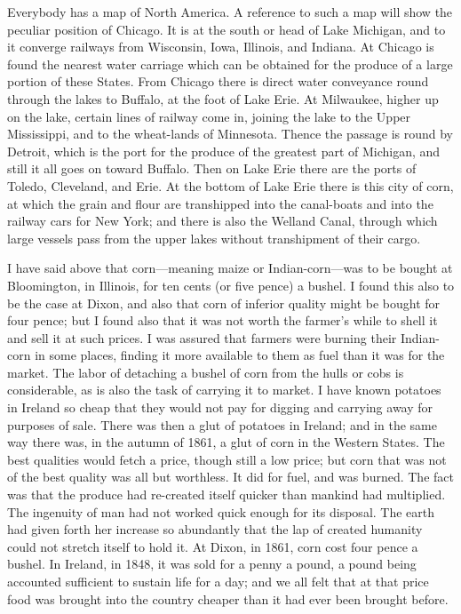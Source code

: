 Everybody has a map of North America.  A reference to such a map
will show the peculiar position of Chicago.  It is at the south or
head of Lake Michigan, and to it converge railways from Wisconsin,
Iowa, Illinois, and Indiana.  At Chicago is found the nearest water
carriage which can be obtained for the produce of a large portion
of these States.  From Chicago there is direct water conveyance
round through the lakes to Buffalo, at the foot of Lake Erie.  At
Milwaukee, higher up on the lake, certain lines of railway come in,
joining the lake to the Upper Mississippi, and to the wheat-lands
of Minnesota.  Thence the passage is round by Detroit, which is the
port for the produce of the greatest part of Michigan, and still it
all goes on toward Buffalo.  Then on Lake Erie there are the ports
of Toledo, Cleveland, and Erie.  At the bottom of Lake Erie there
is this city of corn, at which the grain and flour are transhipped
into the canal-boats and into the railway cars for New York; and
there is also the Welland Canal, through which large vessels pass
from the upper lakes without transhipment of their cargo.

I have said above that corn---meaning maize or Indian-corn---was to
be bought at Bloomington, in Illinois, for ten cents (or five
pence) a bushel.  I found this also to be the case at Dixon, and
also that corn of inferior quality might be bought for four pence;
but I found also that it was not worth the farmer's while to shell
it and sell it at such prices.  I was assured that farmers were
burning their Indian-corn in some places, finding it more available
to them as fuel than it was for the market.  The labor of detaching
a bushel of corn from the hulls or cobs is considerable, as is also
the task of carrying it to market.  I have known potatoes in
Ireland so cheap that they would not pay for digging and carrying
away for purposes of sale.  There was then a glut of potatoes in
Ireland; and in the same way there was, in the autumn of 1861, a
glut of corn in the Western States.  The best qualities would fetch
a price, though still a low price; but corn that was not of the
best quality was all but worthless.  It did for fuel, and was
burned.  The fact was that the produce had re-created itself
quicker than mankind had multiplied.  The ingenuity of man had not
worked quick enough for its disposal.  The earth had given forth
her increase so abundantly that the lap of created humanity could
not stretch itself to hold it.  At Dixon, in 1861, corn cost four
pence a bushel.  In Ireland, in 1848, it was sold for a penny a
pound, a pound being accounted sufficient to sustain life for a
day; and we all felt that at that price food was brought into the
country cheaper than it had ever been brought before.

